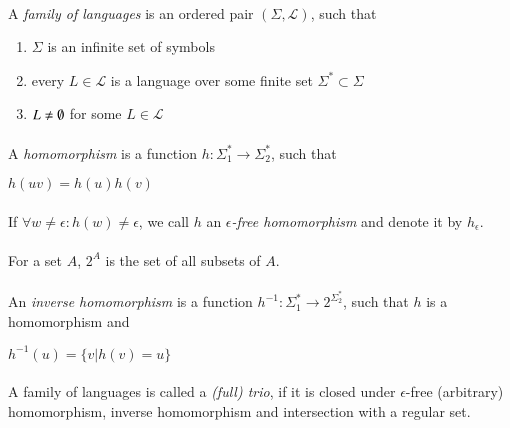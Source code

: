 \paragraph{}
 A \emph{family of languages} is an ordered pair $(\Sigma ,\mathcal{L} )$, such that
\begin{enumerate}
\item $\Sigma $ is an infinite set of symbols
\item every $L\in \mathcal{L} $ is a language over some finite set $\Sigma ^{*} \subset \Sigma $
\item $L \neq \es $ for some $L \in \mathcal{L} $
\end{enumerate}

\paragraph{}
 A \emph{homomorphism} is a function $h: \Sigma_{1}^{*} \rightarrow \Sigma_{2}^{*}$, such that \\	
\centerline{$h(uv) = h(u)h(v)$}

\paragraph{}
\oznacenie If $\forall w \neq \epsilon : h(w) \neq \epsilon $, we call $h$ an \emph{$\epsilon $-free homomorphism} and denote it by $h_{\epsilon }$.

\paragraph{}
\oznacenie For a set $A$, $2^{A}$ is the set of all subsets of $A$.

\paragraph{}
 An \emph{inverse homomorphism} is a function $h^{-1}: \Sigma_{1}^{*} \rightarrow 2^{\Sigma_{2}^{*}}$, such that $h$ is a homomorphism and \\
\centerline{$h^{-1}(u) = \{ v | h(v) = u \} $}

\paragraph{}
 A family of languages is called a \emph{(full) trio}, if it is closed under $\epsilon $-free (arbitrary) homomorphism, inverse homomorphism and intersection with a regular set.

